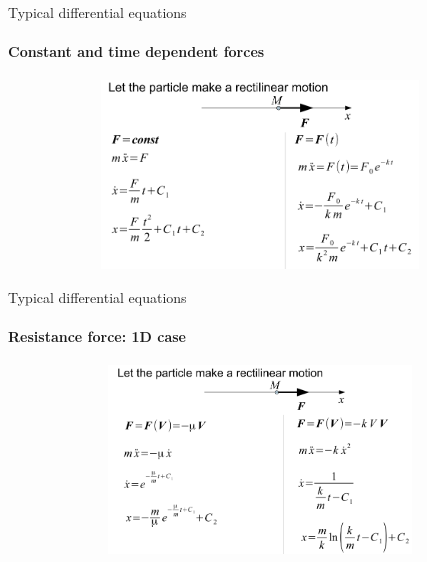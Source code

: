 \documentclass[aspectratio=169]{beamer}
\begin{document}
\begin{frame}[t]{Typical differential equations}
    \framesubtitle{Constant and time dependent forces}
    \vspace*{-0.6cm}
    \begin{center}
        \begin{figure}[H]
            \centering\includegraphics[height=5cm,width=1\textwidth,keepaspectratio]{image18.png}
            \label{fig:image18}
        \end{figure}
    \end{center}
\end{frame}

\begin{frame}[t]{Typical differential equations}
    \framesubtitle{Resistance force: 1D case}
    \vspace*{-0.6cm}
    \begin{center}
        \begin{figure}[H]
            \centering\includegraphics[height=5cm,width=1\textwidth,keepaspectratio]{image11.png}
            \label{fig:image11}
        \end{figure}
    \end{center}
\end{frame}
\end{document}
